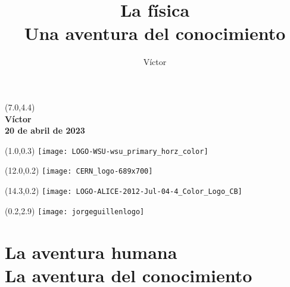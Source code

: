 \documentclass[14pt,aspectratio=169,t]{beamer}
\title{\LARGE \textbf{La física\\Una aventura del conocimiento}}
\author{Víctor}
\date{}
\begin{document}
\begin{frame}{}
  \begin{textblock}{8}(7.0,4.4)
  {}\\
  \vspace{0.1in}
  {\large \textbf{Víctor}}\\
  \vspace{0.2in}
  {\small\textbf{20 de abril de 2023}}
  \end{textblock}
  
  \begin{textblock}{12}(1.0,0.3)
      \texttt{[image: LOGO-WSU-wsu\_primary\_horz\_color]}
  \end{textblock}
  \begin{textblock}{10}(12.0,0.2)
      \texttt{[image: CERN\_logo-689x700]}
  \end{textblock}
  \begin{textblock}{10}(14.3,0.2)
      \texttt{[image: LOGO-ALICE-2012-Jul-04-4\_Color\_Logo\_CB]}
  \end{textblock}
  \begin{textblock}{10}(0.2,2.9)
      \texttt{[image: jorgeguillenlogo]}
  \end{textblock}
\end{frame}

\section{\LARGE \textbf{La aventura humana\\La aventura del conocimiento}}
\end{document}
